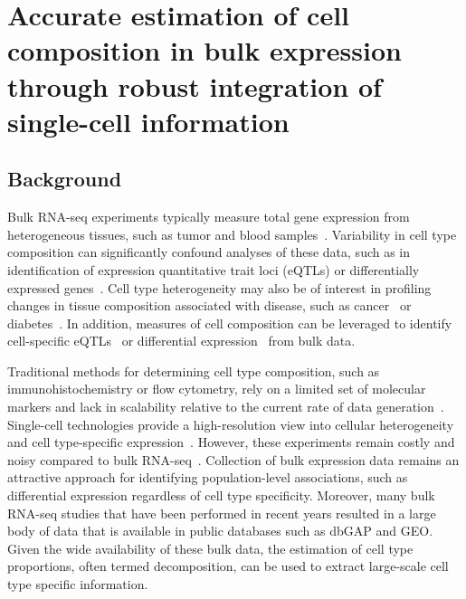 \setlength{\arrayrulewidth}{1.1pt}
\bgroup
\def\arraystretch{1.5}

\chapter{Accurate estimation of cell composition in bulk expression through robust integration of single-cell information}

\section{Background}

Bulk RNA-seq experiments typically measure total gene expression from heterogeneous tissues, such as tumor and blood samples~\cite{Tomczak2015-kt,GTEx_Consortium2015-vl}. Variability in cell type composition can significantly confound analyses of these data, such as in identification of expression quantitative trait loci (eQTLs) or differentially expressed genes~\cite{Bruning2016-vb}. Cell type heterogeneity may also be of interest in profiling changes in tissue composition associated with disease, such as cancer~\cite{Fridman2012-bi} or diabetes~\cite{Rahier1983-gh}. In addition, measures of cell composition can be leveraged to identify cell-specific eQTLs~\cite{Shen-Orr2010-tg,Westra2015-vq} or differential expression~\cite{Shen-Orr2010-tg} from bulk data. 

Traditional methods for determining cell type composition, such as immunohistochemistry or flow cytometry, rely on a limited set of molecular markers and lack in scalability relative to the current rate of data generation~\cite{Hu2016-he}. Single-cell technologies provide a high-resolution view into cellular heterogeneity and cell type-specific expression~\cite{Zheng2017-pq,Tasic2018-ue,Macosko2015-yn}. However, these experiments remain costly and noisy compared to bulk RNA-seq~\cite{Wang2018-oj}. Collection of bulk expression data remains an attractive approach for identifying population-level associations, such as differential expression regardless of cell type specificity. Moreover, many bulk RNA-seq studies that have been performed in recent years resulted in a large body of data that is available in public databases such as dbGAP and GEO. Given the wide availability of these bulk data, the estimation of cell type proportions, often termed decomposition, can be used to extract large-scale cell type specific information.

